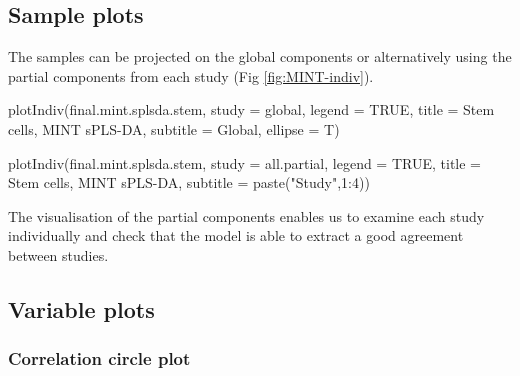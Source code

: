 \documentclass[
]{book}
\newenvironment{Shaded}{\begin{snugshade}}{\end{snugshade}}
\newcommand{\AttributeTok}[1]{\textcolor[rgb]{0.77,0.63,0.00}{#1}}
\newcommand{\ConstantTok}[1]{\textcolor[rgb]{0.00,0.00,0.00}{#1}}
\newcommand{\DecValTok}[1]{\textcolor[rgb]{0.00,0.00,0.81}{#1}}
\newcommand{\FunctionTok}[1]{\textcolor[rgb]{0.00,0.00,0.00}{#1}}
\newcommand{\NormalTok}[1]{#1}
\newcommand{\SpecialCharTok}[1]{\textcolor[rgb]{0.00,0.00,0.00}{#1}}
\newcommand{\StringTok}[1]{\textcolor[rgb]{0.31,0.60,0.02}{#1}}
\begin{document}
\hypertarget{mint:result:ncomp}{%
\subsection{Sample plots}\label{mint:result:ncomp}}

The samples can be projected on the global components or alternatively using the partial components from each study (Fig \ref{fig:MINT-indiv}).

\begin{Shaded}
\begin{Highlighting}[]
\FunctionTok{plotIndiv}\NormalTok{(final.mint.splsda.stem, }\AttributeTok{study =} \StringTok{\textquotesingle{}global\textquotesingle{}}\NormalTok{, }\AttributeTok{legend =} \ConstantTok{TRUE}\NormalTok{, }
          \AttributeTok{title =} \StringTok{\textquotesingle{}Stem cells, MINT sPLS{-}DA\textquotesingle{}}\NormalTok{, }
          \AttributeTok{subtitle =} \StringTok{\textquotesingle{}Global\textquotesingle{}}\NormalTok{, }\AttributeTok{ellipse =}\NormalTok{ T)}
\end{Highlighting}
\end{Shaded}

\begin{Shaded}
\begin{Highlighting}[]
\FunctionTok{plotIndiv}\NormalTok{(final.mint.splsda.stem, }\AttributeTok{study =} \StringTok{\textquotesingle{}all.partial\textquotesingle{}}\NormalTok{, }\AttributeTok{legend =} \ConstantTok{TRUE}\NormalTok{, }
          \AttributeTok{title =} \StringTok{\textquotesingle{}Stem cells, MINT sPLS{-}DA\textquotesingle{}}\NormalTok{, }
          \AttributeTok{subtitle =} \FunctionTok{paste}\NormalTok{(}\StringTok{"Study"}\NormalTok{,}\DecValTok{1}\SpecialCharTok{:}\DecValTok{4}\NormalTok{))}
\end{Highlighting}
\end{Shaded}



The visualisation of the partial components enables us to examine each study individually and check that the model is able to extract a good agreement between studies.

\hypertarget{mint:result:varplot}{%
\subsection{Variable plots}\label{mint:result:varplot}}

\hypertarget{correlation-circle-plot}{%
\subsubsection{Correlation circle plot}\label{correlation-circle-plot}}
\end{document}

